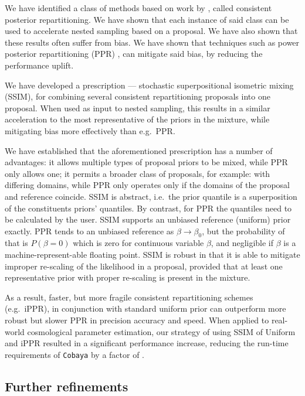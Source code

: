 \documentclass[usenatbib]{mnras}
\begin{document}
We have identified a class of methods based on work by
\cite{chen-ferroz-hobson}, called consistent posterior
repartitioning. We have shown that each instance of said class can be
used to accelerate nested sampling based on a proposal. We have also
shown that these results often suffer from bias. We have shown that
techniques such as power posterior repartitioning (PPR)
\cite{chen-ferroz-hobson}, can mitigate said bias, by reducing the
performance uplift.

We have developed a prescription --- stochastic superpositional
isometric mixing (SSIM), for combining several consistent repartitioning
proposals into one proposal. When used as input to nested sampling,
this results in a similar acceleration to the most representative of
the priors in the mixture, while mitigating bias more effectively than
e.g.~PPR.

We have established that the aforementioned prescription has a number
of advantages: it allows multiple types of proposal priors to be
mixed, while PPR only allows one; it permits a broader class of
proposals, for example: with differing domains, while PPR only
operates only if the domains of the proposal and reference coincide.
SSIM is abstract, i.e.~the prior quantile is a superposition of the
constituents priors' quantiles. By contrast, for PPR the quantiles
need to be calculated by the user. SSIM supports an unbiased reference
(uniform) prior exactly. PPR tends to an unbiased reference as
\(\beta\rightarrow\beta_{0}\), but the probability of that is
\(P(\beta=0)\) which is zero for continuous variable $\beta$, and
negligible if $\beta$ is a machine-represent-able floating point. SSIM
is robust in that it is able to mitigate improper re-scaling of the
likelihood in a proposal, provided that at least one representative
prior with proper re-scaling is present in the mixture.

As a result, faster, but more fragile consistent repartitioning
schemes (e.g.~iPPR), in conjunction with standard uniform prior can
outperform more robust but slower PPR in precision accuracy and speed.
When applied to real-world cosmological parameter estimation, our
strategy of using SSIM of Uniform and iPPR resulted in a significant
performance increase, reducing the run-time requirements of
\texttt{Cobaya} by a factor of \TODO.

\subsection{Further refinements}\label{sec:org8314ddf}
\end{document}
